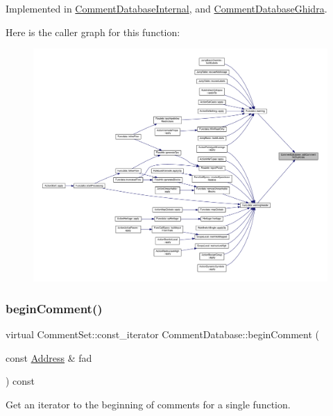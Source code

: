 Implemented in \mbox{\hyperlink{class_comment_database_internal_af3ba80fc4fd50954903bf2d0c54f36a8}{Comment\+Database\+Internal}}, and \mbox{\hyperlink{class_comment_database_ghidra_a39ad32e0b6abb1ee32c96780ac9b446c}{Comment\+Database\+Ghidra}}.

Here is the caller graph for this function\+:
\nopagebreak
\begin{figure}[H]
\begin{center}
\leavevmode
\includegraphics[width=350pt]{class_comment_database_a41b306ed1b9ac26a4b2c80a927be3364_icgraph}
\end{center}
\end{figure}
\mbox{\label{class_comment_database_a4eb1eb37180fc092244b37ea11f7f2a4}} 
\subsubsection{\texorpdfstring{beginComment()}{beginComment()}}
{\footnotesize\ttfamily virtual Comment\+Set\+::const\+\_\+iterator Comment\+Database\+::begin\+Comment (\begin{DoxyParamCaption}\item[{const \mbox{\hyperlink{class_address}{Address}} \&}]{fad }\end{DoxyParamCaption}) const\hspace{0.3cm}{\ttfamily [pure virtual]}}



Get an iterator to the beginning of comments for a single function. 


